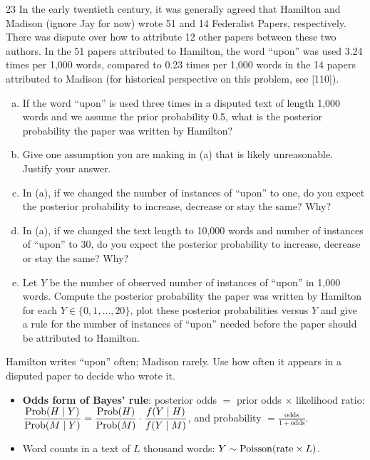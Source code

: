 \documentclass[11pt]{article}
\begin{document}

\begin{problem}{23}
In the early twentieth century, it was generally agreed that Hamilton and Madison (ignore Jay for now) wrote 51 and 14 Federalist Papers, respectively. There was dispute over how to attribute 12 other papers between these two authors. In the 51 papers attributed to Hamilton, the word ``upon'' was used 3.24 times per 1,000 words, compared to 0.23 times per 1,000 words in the 14 papers attributed to Madison (for historical perspective on this problem, see [110]).
\begin{enumerate}[(a)]
\item If the word ``upon'' is used three times in a disputed text of length 1,000 words and we assume the prior probability 0.5, what is the posterior probability the paper was written by Hamilton?
\item Give one assumption you are making in (a) that is likely unreasonable. Justify your answer.
\item In (a), if we changed the number of instances of ``upon'' to one, do you expect the posterior probability to increase, decrease or stay the same? Why?
\item In (a), if we changed the text length to 10,000 words and number of instances of ``upon'' to 30, do you expect the posterior probability to increase, decrease or stay the same? Why?
\item Let $Y$ be the number of observed number of instances of ``upon'' in 1,000 words. Compute the posterior probability the paper was written by Hamilton for each $Y\in\{0,1,\dots,20\}$, plot these posterior probabilities versus $Y$ and give a rule for the number of instances of ``upon'' needed before the paper should be attributed to Hamilton.
\end{enumerate}
\end{problem}

\begin{restate}
Hamilton writes ``upon'' often; Madison rarely. Use how often it appears in a disputed paper to decide who wrote it.
\end{restate}

\begin{recall}
\begin{itemize}
\item \textbf{Odds form of Bayes' rule}: posterior odds $=$ prior odds $\times$ likelihood ratio:
$\dfrac{\mathrm{Prob}(H\mid Y)}{\mathrm{Prob}(M\mid Y)}=\dfrac{\mathrm{Prob}(H)}{\mathrm{Prob}(M)}\cdot\dfrac{f(Y\mid H)}{f(Y\mid M)}$, and probability $=\frac{\text{odds}}{1+\text{odds}}$.
\item Word counts in a text of $L$ thousand words: $Y\sim\mathrm{Poisson}(\text{rate}\times L)$.
\end{itemize}
\end{recall}
\end{document}

